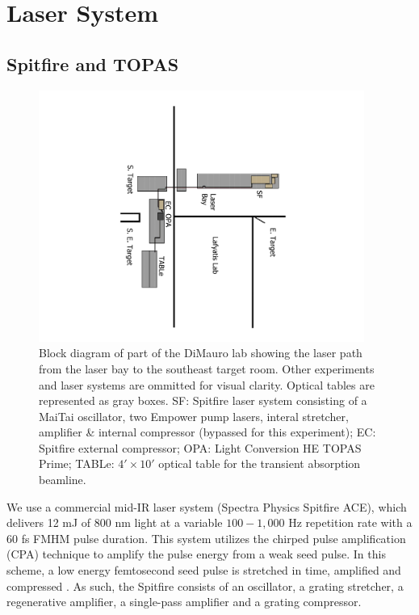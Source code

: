 \section{Laser System}

\subsection{Spitfire and TOPAS}

\begin{figure}
	\centering
	\includegraphics[width=0.95\textwidth,angle=90]{figures/chap2/beam_routing2.pdf}
	\caption{Block diagram of part of the DiMauro lab showing the laser path from the laser bay to the southeast target room. Other experiments and laser systems are ommitted for visual clarity. Optical tables are represented as gray boxes. SF: Spitfire laser system consisting of a MaiTai oscillator, two Empower pump lasers, interal stretcher, amplifier \& internal compressor (bypassed for this experiment); EC: Spitfire external compressor; OPA: Light Conversion HE TOPAS Prime; TABLe: $4' \times 10'$ optical table for the transient absorption beamline.}
	\label{fig:beam_routing}
\end{figure}

We use a commercial mid-IR laser system (Spectra Physics Spitfire ACE), which delivers 12 mJ of 800 nm light at a variable $100 - 1,000$ Hz repetition rate with a 60 fs FMHM pulse duration. This system utilizes the chirped pulse amplification (CPA) technique to amplify the pulse energy from a weak seed pulse. In this scheme, a low energy femtosecond seed pulse is stretched in time, amplified and compressed \cite{stricklandCompressionAmplifiedChirped1985}. As such, the Spitfire consists of an oscillator, a grating stretcher, a regenerative amplifier, a single-pass amplifier and a grating compressor.

